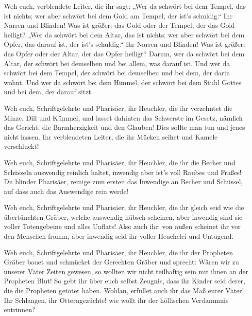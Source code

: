  Weh euch, verblendete Leiter, die ihr sagt: „Wer da
schwört bei dem Tempel, das ist nichts; wer aber schwört bei dem Gold am
Tempel, der ist's schuldig.``  Ihr Narren und Blinden!
Was ist größer: das Gold oder der Tempel, der das Gold heiligt?
 „Wer da schwört bei dem Altar, das ist nichts; wer aber
schwört bei dem Opfer, das darauf ist, der ist's schuldig.``
 Ihr Narren und Blinden! Was ist größer: das Opfer oder
der Altar, der das Opfer heiligt?  Darum, wer da schwört
bei dem Altar, der schwört bei demselben und bei allem, was darauf ist.
 Und wer da schwört bei dem Tempel, der schwört bei
demselben und bei dem, der darin wohnt.  Und wer da
schwört bei dem Himmel, der schwört bei dem Stuhl Gottes und bei dem,
der darauf sitzt.

 Weh euch, Schriftgelehrte und Pharisäer, ihr Heuchler,
die ihr verzehntet die Minze, Dill und Kümmel, und lasset dahinten das
Schwerste im Gesetz, nämlich das Gericht, die Barmherzigkeit und den
Glauben! Dies sollte man tun und jenes nicht lassen.  Ihr
verblendeten Leiter, die ihr Mücken seihet und Kamele verschluckt!

 Weh euch, Schriftgelehrte und Pharisäer, ihr Heuchler,
die ihr die Becher und Schüsseln auswendig reinlich haltet, inwendig
aber ist's voll Raubes und Fraßes!  Du blinder Pharisäer,
reinige zum ersten das Inwendige an Becher und Schüssel, auf dass auch
das Auswendige rein werde!

 Weh euch, Schriftgelehrte und Pharisäer, ihr Heuchler,
die ihr gleich seid wie die übertünchten Gräber, welche auswendig hübsch
scheinen, aber inwendig sind sie voller Totengebeine und alles Unflats!
 Also auch ihr: von außen scheinet ihr vor den Menschen
fromm, aber inwendig seid ihr voller Heuchelei und Untugend.

 Weh euch, Schriftgelehrte und Pharisäer, ihr Heuchler,
die ihr der Propheten Gräber bauet und schmücket der Gerechten Gräber
 und sprecht: Wären wir zu unserer Väter Zeiten gewesen,
so wollten wir nicht teilhaftig sein mit ihnen an der Propheten Blut!
 So gebt ihr über euch selbst Zeugnis, dass ihr Kinder
seid derer, die die Propheten getötet haben.  Wohlan,
erfüllet auch ihr das Maß eurer Väter!  Ihr Schlangen,
ihr Otterngezüchte! wie wollt ihr der höllischen Verdammnis entrinnen?


